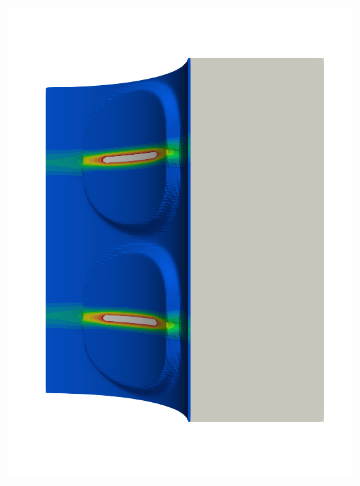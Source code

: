 \begin{frame}
\begin{columns}[T]
\begin{column}{0.6\textwidth}
\begin{figure}
{\begin{subfigure}{0.19\textwidth}
            \includegraphics[width=\textwidth]{examples/figures/seed_d_6}
          \end{subfigure}
          \hspace{0.06\textwidth}
          \begin{subfigure}{0.19\textwidth}
            \centering

\end{subfigure}}
\end{figure}
\end{column}
\end{columns}
\end{frame}
